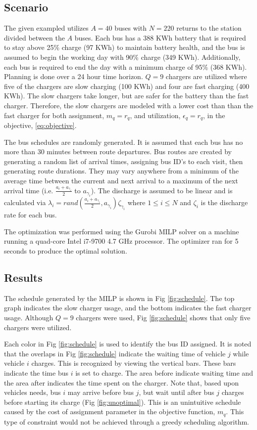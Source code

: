 \documentclass[letterpaper, 10pt, conference]{IEEEtran}
\begin{document}
\subsection{Scenario}
The given exampled utilizes $A = 40$ buses with $N = 220$ returns to the station divided between the $A$ buses. Each bus has a 388 KWh battery that is required to stay above 25\% charge (97 KWh) to maintain battery health, and the bus is assumed to begin the working day with 90\% charge (349 KWh). Additionally, each bus is required to end the day with a minimum charge of 95\% (368 KWh). Planning is done over a 24 hour time horizon. $Q = 9$ chargers are utilized where five of the chargers are slow charging (100 KWh) and four are fast charging (400 KWh). The slow chargers take longer, but are safer for the battery than the fast charger. Therefore, the slow chargers are modeled with a lower cost than than the fast charger for both assignment, $m_q = r_q$, and utilization, $\epsilon_q = r_q$, in the objective, \eqref{eq:objective}.

The bus schedules are randomly generated. It is assumed that each bus has no more than 30 minutes between route departures. Bus routes are created by generating a random list of arrival times, assigning bus ID's to each visit, then generating route durations. They may vary anywhere from a minimum of the average time between the current and next arrival to a maximum of the next arrival time (i.e. $\frac{a_i + a_{\gamma_i}}{2}$ to $a_{\gamma_i}$). The discharge is assumed to be linear and is calculated via $\lambda_i = rand(\frac{a_i + a_{\gamma_i}}{2},a_{\gamma_i})\zeta_{\gamma_i}$ where $1 \leq i \leq N$ and $\zeta_i$ is the discharge rate for each bus.

The optimization was performed using the Gurobi MILP solver \cite{Hespanha2018} on a machine running a quad-core Intel i7-9700 4.7 GHz processor. The optimizer ran for 5 seconds to produce the optimal solution.

\subsection{Results}
The schedule generated by the MILP is shown in Fig \ref{fig:schedule}. The top graph indicates the slow charger usage, and the bottom indicates the fast charger usage. Although $Q = 9$ chargers were used, Fig \ref{fig:schedule} shows that only five chargers were utilized.

Each color in Fig \ref{fig:schedule} is used to identify the bus ID assigned. It is noted that the overlaps in Fig \ref{fig:schedule} indicate the waiting time of vehicle $j$ while vehicle $i$ charges. This is recognized by viewing the vertical bars. These bars indicate the time bus $i$ is set to charge. The area before indicate waiting time and the area after indicates the time spent on the charger. Note that, based upon vehicles needs, bus $i$ may arrive before bus $j$, but wait until after bus $j$ charges before starting its charge (Fig \ref{fig:unoptimal}). This is an unintuitive schedule caused by the cost of assignment parameter in the objective function, $m_q$. This type of constraint would not be achieved through a greedy scheduling algorithm.
\end{document}
